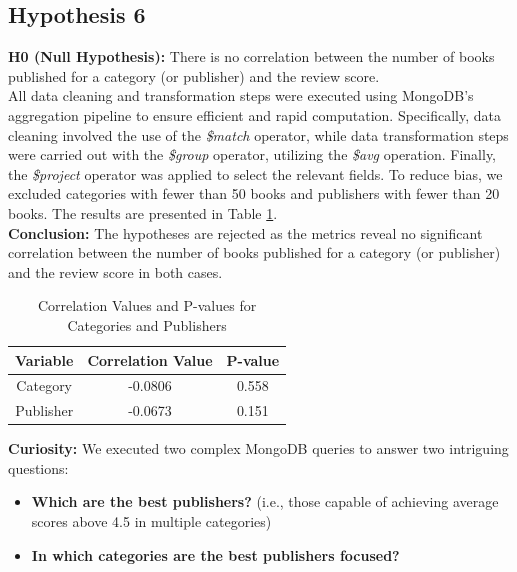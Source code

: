 \subsection*{Hypothesis 6}

\textbf{H0 (Null Hypothesis):} There is no correlation between the number of books published for a category (or publisher) and the review score.\\
All data cleaning and transformation steps were executed using MongoDB's aggregation pipeline to ensure efficient and rapid computation. 
Specifically, data cleaning involved the use of the \textit{\$match} operator, while data transformation steps were carried out with 
the \textit{\$group} operator, utilizing the \textit{\$avg} operation. Finally, the \textit{\$project} operator was applied to select 
the relevant fields. To reduce bias, we excluded categories with fewer than 50 books and publishers with fewer than 20 books.
The results are presented in Table \ref{tab:h6_correlations}.\\
\textbf{Conclusion:} The hypotheses are rejected as the metrics reveal no significant correlation between the number of books published 
for a category (or publisher) and the review score in both cases.

\begin{table}[H]
    \footnotesize
    \centering
    \caption{Correlation Values and P-values for Categories and Publishers}
    \begin{tabular}{|c|c|c|}
    \hline
    \textbf{Variable} & \textbf{Correlation Value} & \textbf{P-value} \\
    \hline
    Category & -0.0806 & 0.558 \\
    \hline
    Publisher & -0.0673 & 0.151 \\
    \hline
    \end{tabular}
    \label{tab:h6_correlations}
\end{table}

\textbf{Curiosity:}
We executed two complex MongoDB queries to answer two intriguing questions:

\begin{itemize}[leftmargin=*, noitemsep]
    \item \textbf{Which are the best publishers?} (i.e., those capable of achieving average scores above 4.5 in multiple categories)
    \item \textbf{In which categories are the best publishers focused?}
\end{itemize}

